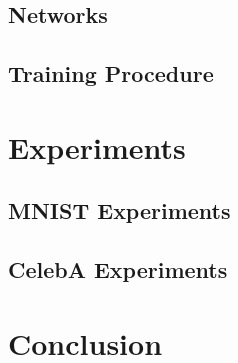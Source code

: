 \documentclass{article}
\begin{document}
\subsection{Networks}

\subsection{Training Procedure}


\section{Experiments}

\subsection{MNIST Experiments}

\subsection{CelebA Experiments}

\section{Conclusion}

\pagebreak



\end{document}
